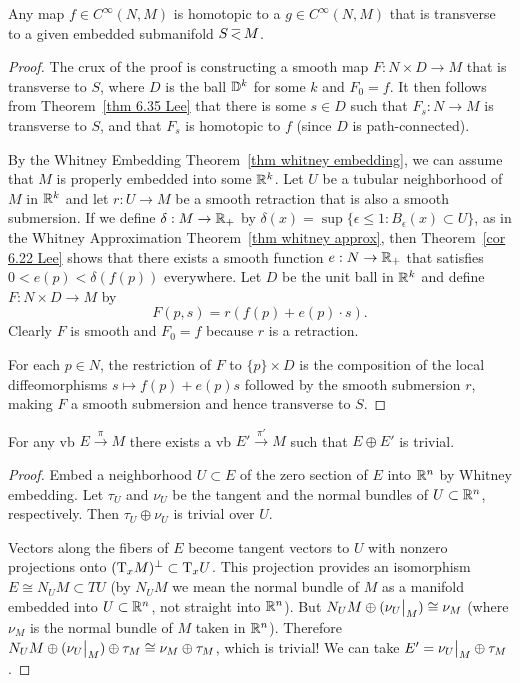 \begin{thm}\label{transverse homotopy thm}
Any map $f\in C^\infty(N,M)$ is homotopic to a $g\in C^\infty(N,M)$ that is transverse to a given embedded submanifold $S\emb M$.
\end{thm}
\begin{proof}
The crux of the proof is constructing a smooth map $F:N\times D\to M$ that is transverse to $S$, where $D$ is the ball $\mathbb{D}^k$ for some $k$ and $F_0=f$. It then follows from Theorem~\ref{thm 6.35 Lee} that there is some $s\in D$ such that $F_s:N\to M$ is transverse to $S$, and that $F_s$ is homotopic to $f$ (since $D$ is path-connected).

By the Whitney Embedding Theorem~\ref{thm whitney embedding}, we can assume that $M$ is properly embedded into some $\mathbb{R}^k$. Let $U$ be a tubular neighborhood of $M$ in $\mathbb{R}^k$ and let $r:U\to M$ be a smooth retraction that is also a smooth submersion. If we define $\delta:M\to \mathbb{R}_+$ by $\delta(x)=\sup\{\epsilon\leq 1:B_\epsilon(x)\subset U\}$, as in the Whitney Approximation Theorem~\ref{thm whitney approx}, then Theorem~\ref{cor 6.22 Lee} shows that there exists a smooth function $e:N\to \mathbb{R}_+$ that satisfies $0<e(p)<\delta(f(p))$ everywhere. Let $D$ be the unit ball in $\mathbb{R}^k$ and define $F:N\times D\to M$ by
\[F(p,s)=r(f(p)+e(p)\cdot s).\]
Clearly  $F$ is smooth and $F_0=f$ because $r$ is a retraction. 

For each $p\in N$, the restriction of $F$ to $\{p\}\times D$ is the composition of the local diffeomorphisms $s\mapsto f(p)+e(p)s$ followed by the smooth submersion $r$, making $F$ a smooth submersion and hence transverse to $S$.
\end{proof}


\begin{thm}\label{every VB is summand of trivial VB}
    For any \gls{vb} $E\overset{\pi}{\to} M$ there exists a \gls{vb} $E'\overset{\pi'}{\to} M$ such that $E\oplus E'$ is trivial.
\end{thm}
\begin{proof}
    Embed a neighborhood $U\subset E$ of the zero section of $E$ into $\mathbb{R}^n$ by Whitney embedding. Let $\tau_U$ and $\nu_U$ be the tangent and the normal bundles of $U\subset \mathbb{R}^n$, respectively. Then $\tau_U\oplus \nu_U$ is trivial over $U$.
    
    Vectors along the fibers of $E$ become tangent vectors to $U$ with nonzero projections onto $(\mathrm{T}_x M)^\perp\subset \mathrm{T}_x U$. This projection provides an isomorphism $E\cong N_U M\subset TU$ (by $N_U M$ we mean the normal bundle of $M$ as a manifold embedded into $U\subset \mathbb{R}^n$, not straight into $\mathbb{R}^n$). But $N_U M\oplus (\restr{\nu_U}{M})\cong \nu_M$ (where $\nu_M$ is the normal bundle of $M$ taken in $\mathbb{R}^n$). Therefore $N_U M\oplus (\restr{\nu_U}{M})\oplus \tau_M\cong \nu_M\oplus \tau_M $, which is trivial! We can take $E'=\restr{\nu_U}{M}\oplus \tau_M$.
\end{proof}

